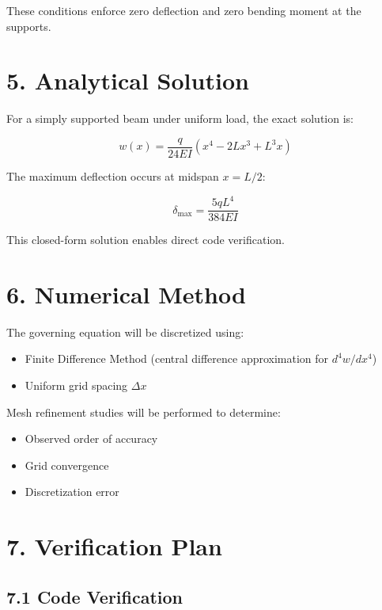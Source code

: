 \documentclass[12pt]{article}
\begin{document}
These conditions enforce zero deflection and zero bending moment at the supports.

\section*{5. Analytical Solution}

For a simply supported beam under uniform load, the exact solution is:

\begin{equation}
w(x) = \frac{q}{24 E I}
\left(x^4 - 2Lx^3 + L^3 x\right)
\end{equation}

The maximum deflection occurs at midspan $x = L/2$:

\begin{equation}
\delta_{\max} = \frac{5 q L^4}{384 E I}
\end{equation}

This closed-form solution enables direct code verification.

\section*{6. Numerical Method}

The governing equation will be discretized using:

\begin{itemize}
\item Finite Difference Method (central difference approximation for $d^4w/dx^4$)
\item Uniform grid spacing $\Delta x$
\end{itemize}

Mesh refinement studies will be performed to determine:

\begin{itemize}
\item Observed order of accuracy
\item Grid convergence
\item Discretization error
\end{itemize}

\section*{7. Verification Plan}

\subsection*{7.1 Code Verification}
\end{document}
